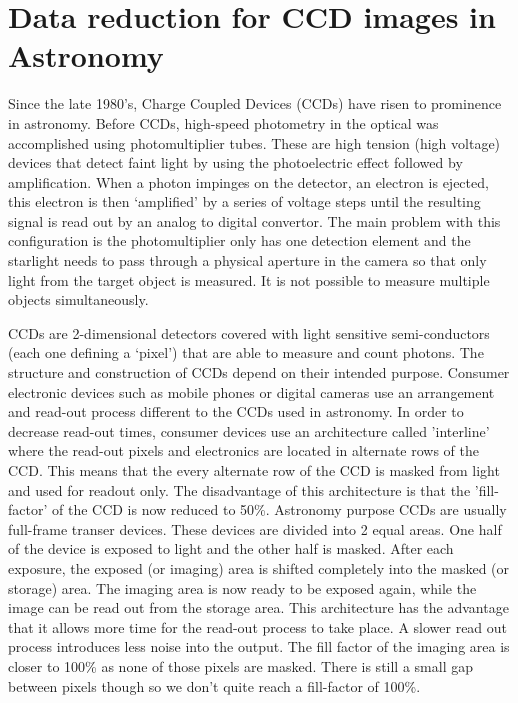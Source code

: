 \section{Data reduction for CCD images in Astronomy}
Since the late 1980's, Charge Coupled Devices (CCDs) have risen to prominence in astronomy. Before CCDs, high-speed photometry in the optical was accomplished using photomultiplier tubes. These are high tension (high voltage) devices that detect faint light by using the photoelectric effect followed by amplification. When a photon impinges on the detector, an electron is ejected, this electron is then `amplified' by a series of voltage steps until the resulting signal is read out by an analog to digital convertor. The main problem with this configuration is the photomultiplier only has one detection element and the starlight needs to pass through a physical aperture in the camera so that only light from the target object is measured. It is not possible to measure multiple objects simultaneously. 

CCDs are 2-dimensional detectors covered with light sensitive semi-conductors (each one defining a `pixel') that are able to measure and count photons. The structure and construction of CCDs depend on their intended purpose. Consumer electronic devices such as mobile phones or digital cameras use an arrangement and read-out process different to the CCDs used in astronomy. In order to decrease read-out times, consumer devices use an architecture called 'interline' where the read-out pixels and electronics are located in alternate rows of the CCD. This means that the every alternate row of the CCD is masked from light and used for readout only. The disadvantage of this architecture is that the 'fill-factor' of the CCD is now reduced to 50\%. Astronomy purpose CCDs are usually full-frame transer devices. These devices are divided into 2 equal areas. One half of the device is exposed to light and the other half is masked. After each exposure, the exposed (or imaging) area is shifted completely into the masked (or storage) area. The imaging area is now ready to be exposed again, while the image can be read out from the storage area. This architecture has the advantage that it allows more time for the read-out process to take place. A slower read out process introduces less noise into the output. The fill factor of the imaging area is closer to 100\% as none of those pixels are masked. There is still a small gap between pixels though so we don't quite reach a fill-factor of 100\%. 

